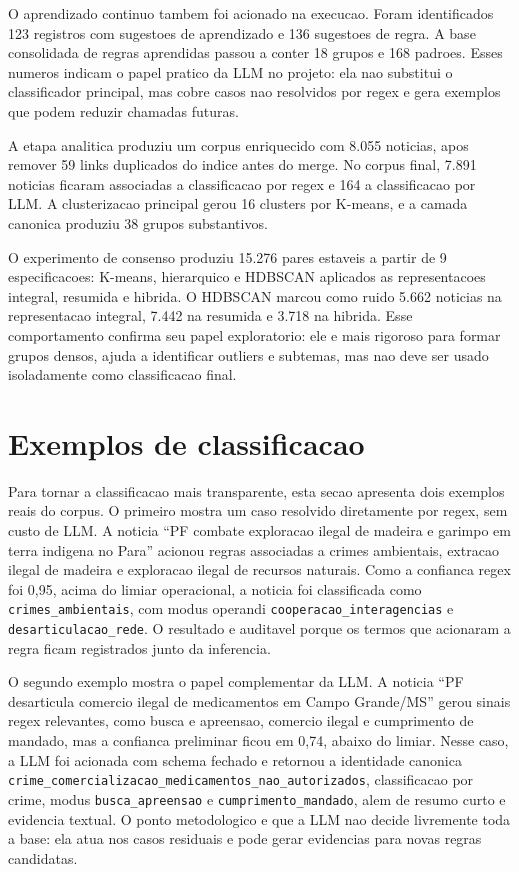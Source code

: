 \documentclass[12pt]{article}
\begin{document}
O aprendizado continuo tambem foi acionado na execucao. Foram identificados 123 registros com sugestoes de aprendizado e 136 sugestoes de regra. A base consolidada de regras aprendidas passou a conter 18 grupos e 168 padroes. Esses numeros indicam o papel pratico da LLM no projeto: ela nao substitui o classificador principal, mas cobre casos nao resolvidos por regex e gera exemplos que podem reduzir chamadas futuras.

A etapa analitica produziu um corpus enriquecido com 8.055 noticias, apos remover 59 links duplicados do indice antes do merge. No corpus final, 7.891 noticias ficaram associadas a classificacao por regex e 164 a classificacao por LLM. A clusterizacao principal gerou 16 clusters por K-means, e a camada canonica produziu 38 grupos substantivos.

O experimento de consenso produziu 15.276 pares estaveis a partir de 9 especificacoes: K-means, hierarquico e HDBSCAN aplicados as representacoes integral, resumida e hibrida. O HDBSCAN marcou como ruido 5.662 noticias na representacao integral, 7.442 na resumida e 3.718 na hibrida. Esse comportamento confirma seu papel exploratorio: ele e mais rigoroso para formar grupos densos, ajuda a identificar outliers e subtemas, mas nao deve ser usado isoladamente como classificacao final.

\section{Exemplos de classificacao}

Para tornar a classificacao mais transparente, esta secao apresenta dois exemplos reais do corpus. O primeiro mostra um caso resolvido diretamente por regex, sem custo de LLM. A noticia ``PF combate exploracao ilegal de madeira e garimpo em terra indigena no Para'' acionou regras associadas a crimes ambientais, extracao ilegal de madeira e exploracao ilegal de recursos naturais. Como a confianca regex foi 0,95, acima do limiar operacional, a noticia foi classificada como \texttt{crimes\_ambientais}, com modus operandi \texttt{cooperacao\_interagencias} e \texttt{desarticulacao\_rede}. O resultado e auditavel porque os termos que acionaram a regra ficam registrados junto da inferencia.

O segundo exemplo mostra o papel complementar da LLM. A noticia ``PF desarticula comercio ilegal de medicamentos em Campo Grande/MS'' gerou sinais regex relevantes, como busca e apreensao, comercio ilegal e cumprimento de mandado, mas a confianca preliminar ficou em 0,74, abaixo do limiar. Nesse caso, a LLM foi acionada com schema fechado e retornou a identidade canonica \texttt{crime\_comercializacao\_medicamentos\_nao\_autorizados}, classificacao por crime, modus \texttt{busca\_apreensao} e \texttt{cumprimento\_mandado}, alem de resumo curto e evidencia textual. O ponto metodologico e que a LLM nao decide livremente toda a base: ela atua nos casos residuais e pode gerar evidencias para novas regras candidatas.
\end{document}
